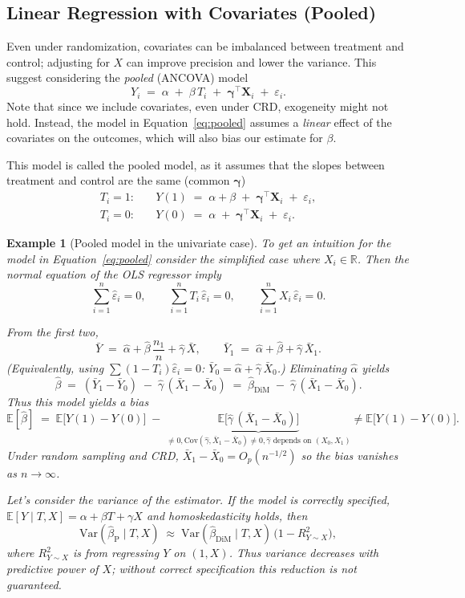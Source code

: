\documentclass[11pt]{exam}
\theoremstyle{plain}
\newtheorem{example}{Example}
\newcommand{\E}{\mathbb{E}}
\newcommand{\R}{\mathbb{R}}
\newcommand{\bX}{\bm{X}}
\newcommand{\Var}{\mathrm{Var}}
\newcommand{\Cov}{\mathrm{Cov}}
\begin{document}
\subsection{Linear Regression with Covariates (Pooled)}
Even under randomization, covariates can be imbalanced between treatment and control; adjusting for \(X\) can improve precision and lower the variance. This suggest considering the \emph{pooled} (ANCOVA) model
\begin{equation}\label{eq:pooled}
    Y_i \;=\; \alpha \;+\; \beta\,T_i \;+\; \bm{\gamma}^\top \bX_i \;+\; \varepsilon_i.
\end{equation}
Note that since we include covariates, even under CRD, exogeneity might not hold. Instead, the model in Equation~\eqref{eq:pooled} assumes a \emph{linear} effect of the covariates on the outcomes, which will also bias our estimate for $\beta$.

This model is called the pooled model, as it assumes that the slopes between treatment and control are the same (common $\bm{\gamma}$)
\[
\begin{aligned}
T_i=1:\quad & Y(1) \;=\; \alpha + \beta \;+\; \bm{\gamma}^\top \bX_i \;+\; \varepsilon_i,\\[3pt]
T_i=0:\quad & Y(0) \;=\; \alpha \;+\; \bm{\gamma}^\top \bX_i \;+\; \varepsilon_i.
\end{aligned}
\]

\begin{example}[Pooled model in the univariate case]\label{ex:pooled}
To get an intuition for the model in Equation~\eqref{eq:pooled} consider the simplified case where $X_i \in \R$. Then the normal equation of the OLS regressor imply
\[
\sum_{i=1}^n \hat\varepsilon_i = 0, 
\qquad 
\sum_{i=1}^n T_i\,\hat\varepsilon_i = 0, 
\qquad 
\sum_{i=1}^n X_i\,\hat\varepsilon_i = 0.
\]

From the first two,
\[
\bar Y \;=\; \hat\alpha + \hat\beta\,\frac{n_1}{n} + \hat\gamma\,\bar X,
\qquad
\bar Y_1 \;=\; \hat\alpha + \hat\beta + \hat\gamma\,\bar X_1.
\]
(Equivalently, using \(\sum (1-T_i)\hat\varepsilon_i=0\): \(\bar Y_0=\hat\alpha+\hat\gamma\,\bar X_0\).)
Eliminating \(\hat\alpha\) yields
\[
\hat\beta
\;=\;
(\bar Y_1 - \bar Y_0)\;-\;\hat\gamma\,(\bar X_1 - \bar X_0) \;=\;
\hat\beta_{\text{DiM}}\;-\;\hat\gamma\,(\bar X_1 - \bar X_0).
\] 
Thus this model yields a bias
\[
\E[\hat\beta]
\;=\; \E\!\big[Y(1)-Y(0)\big]
\;-\; \underbrace{\E\!\big[\hat\gamma\,(\bar X_1-\bar X_0)\big]}_{\neq 0, \Cov(\hat\gamma,\bar X_1-\bar X_0)\neq 0, \hat\gamma \text{ depends on } (X_0, X_1)} \neq \E\!\big[Y(1)-Y(0)\big].
\]
Under random sampling and CRD, \(\bar X_1-\bar X_0=O_p(n^{-1/2})\) so the bias vanishes as \(n\to\infty\).

Let's consider the variance of the estimator. If the model is correctly specified, \(\E[Y\mid T,X]=\alpha+\beta T+\gamma X\) and homoskedasticity holds, then
\[
\Var(\hat\beta_{\text{P}} \mid T, X)
\;\approx\;
\Var(\hat\beta_{\text{DiM}} \mid T, X)\,\big(1 - R^2_{Y\sim X}\big),
\]
where \(R^2_{Y\sim X}\) is from regressing \(Y\) on \((1,X)\).
Thus variance decreases with predictive power of \(X\); without correct specification this reduction is not guaranteed.
\end{example}
\end{document}
